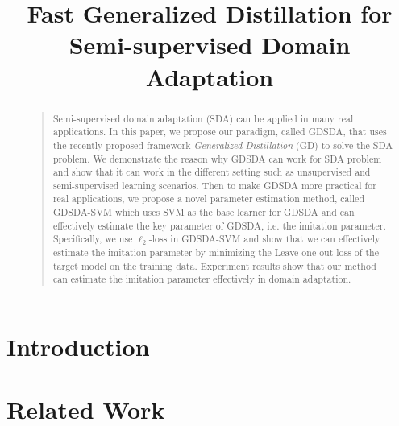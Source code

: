\documentclass[letterpaper]{article}
\begin{document}
%
\title{Fast Generalized Distillation for Semi-supervised Domain Adaptation}
\maketitle
\begin{abstract}
\begin{quote}
Semi-supervised domain adaptation (SDA) can be applied in many real applications. In this paper, we propose our paradigm, called GDSDA, that uses the recently proposed framework \textit{Generalized Distillation} (GD) \cite{lopez2015unifying} to solve the SDA problem.
We demonstrate the reason why GDSDA can work for SDA problem and show that it can work in the different setting such as unsupervised and semi-supervised learning scenarios. Then to make GDSDA more practical for real applications, we propose a novel parameter estimation method, called GDSDA-SVM which uses SVM as the base learner for GDSDA and can effectively estimate the key parameter of GDSDA, i.e. the imitation parameter. Specifically, we use $\ell_2$-loss in GDSDA-SVM and show that we can effectively estimate the imitation parameter by minimizing the Leave-one-out loss of the target model on the training data. Experiment results show that our method can estimate the imitation parameter effectively in domain adaptation.
\end{quote}
\end{abstract}

\section{Introduction}


%

%

\section{Related Work}\label{sec:work}

\end{document}
